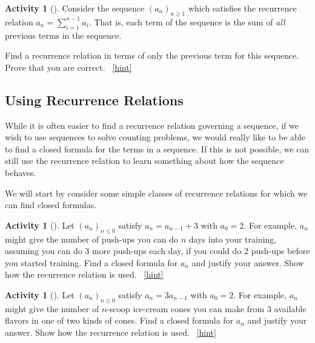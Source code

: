 \documentclass[10pt,]{book}
\theoremstyle{plain}
\theoremstyle{definition}
\theoremstyle{definition}
\theoremstyle{definition}
\newtheorem{activity}[project]{Activity}
\numberwithin{equation}{chapter}
\begin{document}
\begin{activity}[]\label{activity-135}
\hypertarget{p-920}{}%
Consider the sequence \((a_n)_{n \ge 1}\) which satisfies the recurrence relation \(a_n = \sum_{i = 1}^{n-1} a_i\).  That is, each term of the sequence is the sum of \emph{all} previous terms in the sequence.%
\par
\hypertarget{p-921}{}%
Find a recurrence relation in terms of only the previous term for this sequence.  Prove that you are correct.%
~\hfill{\tiny\hyperlink{a-142}{[hint]}\hypertarget{q-142}{}}\end{activity}
\typeout{************************************************}
\typeout{************************************************}
\subsection[{Using Recurrence Relations}]{Using Recurrence Relations}\label{subsec-recursionclosed}
\hypertarget{p-923}{}%
While it is often easier to find a recurrence relation governing a sequence, if we wish to use sequences to solve counting problems, we would really like to be able to find a closed formula for the terms in a sequence. If this is not possible, we can still use the recurrence relation to learn something about how the sequence behaves.%
\par
\hypertarget{p-924}{}%
We will start by consider some simple classes of recurrence relations for which we can find closed formulas.%
\begin{activity}[]\label{act-arithmetic}
\hypertarget{p-925}{}%
Let \((a_n)_{n \le 0}\) satisfy \(a_n = a_{n-1} + 3\) with \(a_0 = 2\).  For example, \(a_n\) might give the number of push-ups you can do \(n\) days into your training, assuming you can do 3 more push-ups each day, if you could do 2 push-ups before you started training.  Find a closed formula for \(a_n\) and justify your answer.  Show how the recurrence relation is used.%
~\hfill{\tiny\hyperlink{a-143}{[hint]}\hypertarget{q-143}{}}\end{activity}
\begin{activity}[]\label{act-geometric}
\hypertarget{p-927}{}%
Let \((a_n)_{n \le 0}\) satisfy \(a_n = 3a_{n-1}\) with \(a_0 = 2\).  For example, \(a_n\) might give the number of \(n\)-scoop ice-cream cones you can make from 3 available flavors in one of two kinds of cones.  Find a closed formula for \(a_n\) and justify your answer.  Show how the recurrence relation is used.%
~\hfill{\tiny\hyperlink{a-144}{[hint]}\hypertarget{q-144}{}}\end{activity}
\end{document}
